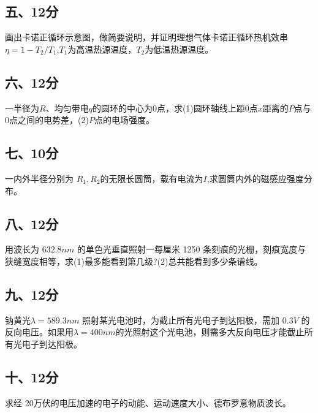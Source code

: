 \subsection{五、12分}
画出卡诺正循环示意图，做简要说明，并证明理想气体卡诺正循环热机效串$\eta=1-T_2/T_1$,$T_1$为高温热源温度，$T_2$为低温热源温度。
\subsection{六、12分}
一半径为$R$、均匀带电$q$的圆环的中心为0点，求(1)圆环轴线上距0点$x$距离的$P$点与0点之间的电势差，(2)$P$点的电场强度。
\subsection{七、10分}
一内外半径分别为 $R_1,R_2$的无限长圆筒，载有电流为$I$,求圆筒内外的磁感应强度分布。
\subsection{八、12分}
用波长为 $632.8nm$ 的单色光垂直照射一每厘米 1250 条刻痕的光栅，刻痕宽度与狭缝宽度相等，求(1)最多能看到第几级?(2)总共能看到多少条谱线。
\subsection{九、12分}
钠黄光$\lambda=589.3nm$ 照射某光电池时，为截止所有光电子到达阳极，需加 $0.3V$ 的反向电压。如果用$\lambda=400nm$的光照射这个光电池，则需多大反向电压才能截止所有光电子到达阳极。
\subsection{十、12分}
求经 20万伏的电压加速的电子的动能、运动速度大小、德布罗意物质波长。